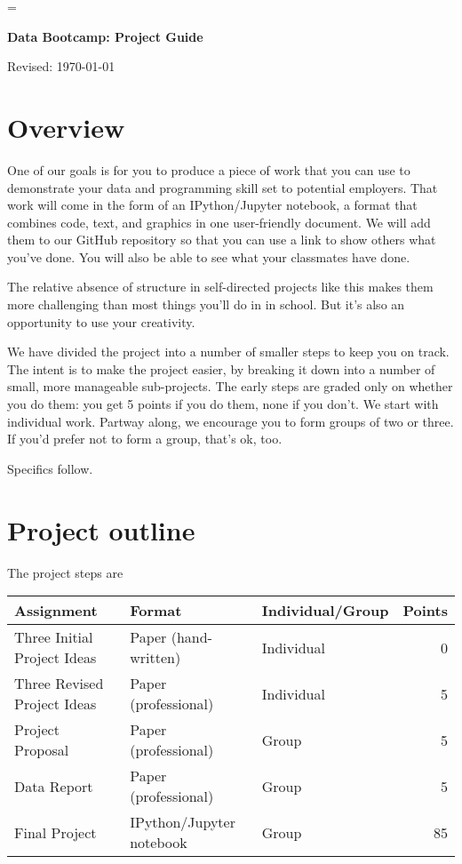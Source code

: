 \documentclass[11pt]{article}
\begin{document}
\parskip=\bigskipamount
\parindent=0.0in
\thispagestyle{empty}


\bigskip\bigskip
\centerline{\Large \bf Data Bootcamp:  Project Guide}
\centerline{Revised: \today}

\section*{Overview}

One of our goals is for you to produce a piece of work that you can use
to demonstrate your data and programming skill set to potential employers.
That work will come in the form of an IPython/Jupyter notebook,
a format that combines code, text, and graphics in one user-friendly document.
We will add them to our GitHub repository so that
you can use a link to show others what you've done.
You will also be able to see what your classmates have done.

The relative absence of structure in self-directed projects like this
makes them more challenging than most things you'll do in in school.
But it's also an opportunity to use your creativity.

We have divided the project into a number of smaller steps to keep you on track.
The intent is to make the project easier, by breaking it down into a number
of small, more manageable sub-projects.
The early steps are graded only on whether you do them:
you get 5 points if you do them, none if you don't.
We start with individual work.  Partway along, we encourage you to form groups
of two or three.
If you'd prefer not to form a group, that's ok, too.

Specifics follow.


\section*{Project outline}

The project steps are
%
\begin{center}
\begin{tabular}{lllr}
\toprule
Assignment                  & Format  & Individual/Group &  Points \\
\midrule
Three Initial Project Ideas         & Paper (hand-written)  & Individual  & 0  \\
Three Revised Project Ideas & Paper (professional)  & Individual  & 5  \\
Project Proposal            & Paper (professional)  & Group       & 5  \\
Data Report                 & Paper (professional)  & Group       & 5  \\
Final Project               & IPython/Jupyter notebook      & Group       & 85 \\
\bottomrule
\end{tabular}
\end{center}
\end{document}
